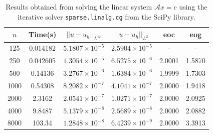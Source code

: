 \documentclass{article}
\numberwithin{equation}{section}
\begin{document}
\begin{table}[H]
\centering
\begin{tabular}{|c|c|c|c|c|c|}
\hline
$n$ & Time(s) & $|| u - u_h ||_{L^{\infty}}$ &$|| u - u_h ||_{L^{2}}$ & eoc & eog \\
\hline
125 & 0.014182 & $5.1807 \times 10^{-5}$ & $2.5904 \times 10^{-5}$ & - & - \\
250 & 0.042605 & $1.3054 \times 10^{-5}$ & $6.5275 \times 10^{-6}$ & 2.0001 & 1.5870 \\
500 & 0.14136 & $3.2767 \times 10^{-6}$ & $1.6384 \times 10^{-6}$ & 1.9999 & 1.7303 \\
1000 & 0.54308 & $8.2082 \times 10^{-7}$ & $4.1041 \times 10^{-7}$ & 2.0000 & 1.9418 \\
2000 & 2.3162 & $2.0541 \times 10^{-7}$ & $1.0271 \times 10^{-7}$ & 2.0000 & 2.0925 \\
4000 & 9.8487 & $5.1379 \times 10^{-8}$ & $2.5689 \times 10^{-8}$ & 2.0000 & 2.0882 \\
8000 & 103.34 & $1.2848 \times 10^{-8}$ & $6.4239 \times 10^{-9}$ & 2.0000 & 3.3913 \\
\hline
\end{tabular}
\captionsetup{justification=centering}
\caption{Results obtained from solving the linear system $\mathcal{A} x = c$ using the iterative solver  \texttt{sparse.linalg.cg} from the SciPy library.}
\end{table}
\end{document}
